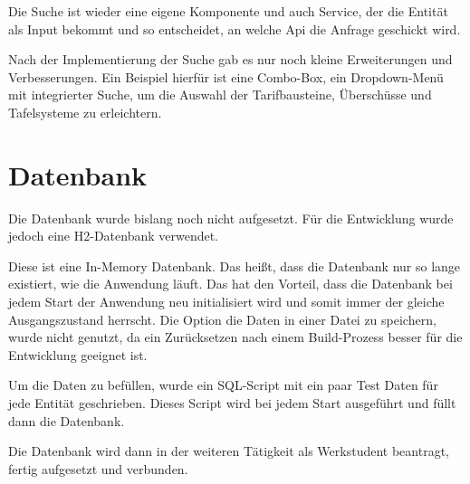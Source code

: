 Die Suche ist wieder eine eigene Komponente und auch Service, der die Entität als Input bekommt und so entscheidet, an welche Api die Anfrage geschickt wird.

Nach der Implementierung der Suche gab es nur noch kleine Erweiterungen und Verbesserungen. Ein Beispiel hierfür ist eine Combo-Box, ein Dropdown-Menü mit integrierter Suche,
um die Auswahl der Tarifbausteine, Überschüsse und Tafelsysteme zu erleichtern.
\section{Datenbank}
Die Datenbank wurde bislang noch nicht aufgesetzt. Für die Entwicklung wurde jedoch eine H2-Datenbank verwendet. 

Diese ist eine In-Memory Datenbank. Das heißt, dass die Datenbank nur so lange existiert, wie die Anwendung läuft.
Das hat den Vorteil, dass die Datenbank bei jedem Start der Anwendung neu initialisiert wird und somit immer der gleiche Ausgangszustand herrscht.
Die Option die Daten in einer Datei zu speichern, wurde nicht genutzt, da ein Zurücksetzen nach einem Build-Prozess besser für die Entwicklung geeignet ist.

Um die Daten zu befüllen, wurde ein SQL-Script mit ein paar Test Daten für jede Entität geschrieben. Dieses Script wird bei jedem Start ausgeführt und
füllt dann die Datenbank.

Die Datenbank wird dann in der weiteren Tätigkeit als Werkstudent beantragt, fertig aufgesetzt und verbunden.


